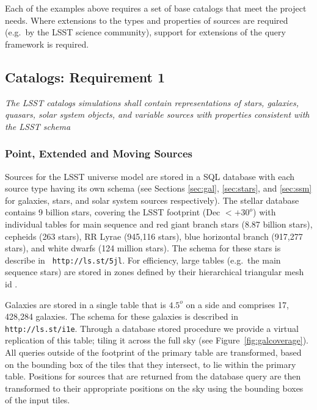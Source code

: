 \documentclass[11pt]{article}
\begin{document}
Each of the examples above requires a set of base catalogs that meet
the project needs.  Where extensions to the types and properties of
sources are required (e.g.\ by the LSST science community), support for
extensions of the query framework is required.

\subsection{Catalogs: Requirement 1}

{\it The LSST catalogs simulations shall contain representations of
  stars, galaxies, quasars, solar system objects, and variable sources
  with properties consistent with the LSST schema}\\

\subsubsection{Point, Extended and Moving Sources}

Sources for the LSST universe model are stored in a SQL database with
each source type having its own schema (see Sections \ref{sec:gal},
\ref{sec:stars}, and \ref{sec:ssm} for galaxies, stars, and solar
system sources respectively). The stellar database contains 9 billion
stars, covering the LSST footprint (Dec $< +30^o$) with individual
tables for main sequence and red giant branch stars (8.87 billion
stars), cepheids (263 stars), RR Lyrae (945,116 stars), blue
horizontal branch (917,277 stars), and white dwarfs (124 million
stars).  The schema for these stars is describe in {\tt
  http://ls.st/5jl}. For efficiency, large tables (e.g.\ the main
sequence stars) are stored in zones defined by their hierarchical
triangular mesh id \citep[HTM][]{htm}.

Galaxies are stored in a single table that is $4.5^o$ on a side and
comprises 17, 428,284 galaxies. The schema for these galaxies is
described in {\tt
  http://ls.st/i1e}.
Through a database stored procedure we provide a virtual replication
of this table; tiling it across the full sky (see
Figure~\ref{fig:galcoverage}). All queries outside of the footprint of
the primary table are transformed, based on the bounding box of the
tiles that they intersect, to lie within the primary table. Positions
for sources that are returned from the database query are then
transformed to their appropriate positions on the sky using the
bounding boxes of the input tiles.
\end{document}
